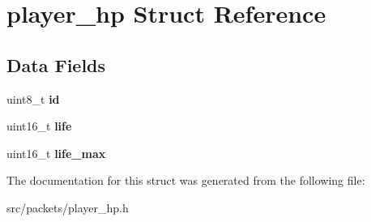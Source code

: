 \hypertarget{structplayer__hp}{}\section{player\+\_\+hp Struct Reference}
\label{structplayer__hp}
\subsection*{Data Fields}
\begin{DoxyCompactItemize}
\item 
\hypertarget{structplayer__hp_afce8ba81c60d503856c9649052b03ce4}{}uint8\+\_\+t {\bfseries id}\label{structplayer__hp_afce8ba81c60d503856c9649052b03ce4}

\item 
\hypertarget{structplayer__hp_ad3c5406562d1224cfeb85a585c9547b5}{}uint16\+\_\+t {\bfseries life}\label{structplayer__hp_ad3c5406562d1224cfeb85a585c9547b5}

\item 
\hypertarget{structplayer__hp_afdca6c9a4a5a2f2421dd2a49c6c518c2}{}uint16\+\_\+t {\bfseries life\+\_\+max}\label{structplayer__hp_afdca6c9a4a5a2f2421dd2a49c6c518c2}

\end{DoxyCompactItemize}


The documentation for this struct was generated from the following file\+:\begin{DoxyCompactItemize}
\item 
src/packets/player\+\_\+hp.\+h\end{DoxyCompactItemize}
